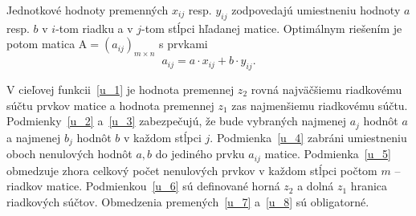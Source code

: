 Jednotkové hodnoty premenných $x_{ij}$ resp. $y_{ij}$ zodpovedajú umiestneniu
hodnoty $a$ resp. $b$ v $i$-tom riadku a v $j$-tom stĺpci hľadanej matice.
Optimálnym riešením je potom matica ${\mathrm A} = (a_{ij})_{m\times n}$  s prvkami
%
$$ a_{ij} = a\cdot x_{ij}+b\cdot y_{ij}.$$

V cieľovej funkcii~\eqref{u_1} je hodnota premennej $z_2$ rovná najväčšiemu
riadkovému súčtu prvkov matice a hodnota premennej $z_1$ zas najmenšiemu
riadkovému súčtu. Podmienky~\eqref{u_2} a~\eqref{u_3} zabezpečujú, že bude
vybraných najmenej $a_j$ hodnôt $a$ a najmenej $b_j$ hodnôt $b$ v každom
stĺpci $j$. 
Podmienka~\eqref{u_4} zabráni umiestneniu oboch nenulových hodnôt
$a,b$ do jediného prvku $a_{ij}$ matice. 
Podmienka~\eqref{u_5}
obmedzuje zhora celkový počet nenulových prvkov v každom stĺpci počtom $m$
-- riadkov matice. Podmienkou~\eqref{u_6}
sú definované horná $z_2$ a dolná $z_1$ hranica riadkových súčtov. 
Obmedzenia premených~\eqref{u_7} a~\eqref{u_8} sú obligatorné.



